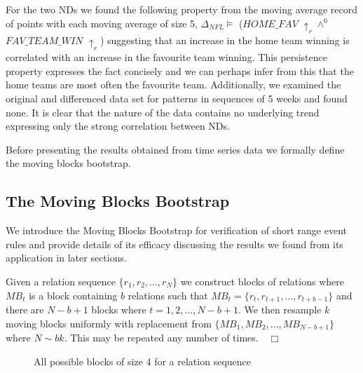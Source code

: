 \medskip

For the two NDs we found the following property from the moving
average record of points with each moving average of size 5,
$\Delta_{NFL} \models$  ($HOME\_FAV$ $\uparrow_r \wedge^0$
$FAV\_TEAM\_WIN$ $\uparrow_r$) suggesting that an
increase in the home team winning is correlated with an increase in
the favourite team winning. This persistence property expresses the fact
concisely and we can perhaps infer from this that the home teams are
most often the favourite team. Additionally, we examined the original
and differenced data set for patterns in sequences of 5 weeks and
found none. It is 
clear that the nature of the data contains no underlying trend 
expressing only the strong correlation between NDs.

\medskip

Before presenting the results obtained from time series data we
formally define the moving blocks bootstrap.

\subsection{The Moving Blocks Bootstrap}\label{subsec:tr_mbb}


We introduce the Moving Blocks Bootstrap for verification of short
range event rules and provide details of its efficacy discussing the
results we found from its application in later sections.

\begin{definition}\label{def:mbb}
\begin{rm}
Given a relation sequence $\{ r_1, r_2, \ldots, r_N \}$
we construct blocks of relations where $MB_t$ is a block containing
$b$ relations such that $MB_t = \{ r_t, r_{t+1}, \ldots, r_{t+b-1} \}$
and there are $N - b+ 1$ blocks where $t = 1, 2, \ldots, N-b+1$. We
then resample $k$ moving blocks uniformly with replacement from $\{
MB_1, MB_2, \ldots, MB_{N-b+1} \}$ where $N \sim bk$. This may be repeated any number of times.$\quad\Box$
\end{rm}
\end{definition}

\smallskip

\begin{figure}[ht]
\centerline{}
\caption{\label{fig:mbb} All possible blocks of size 4 for a relation sequence}
\end{figure}

